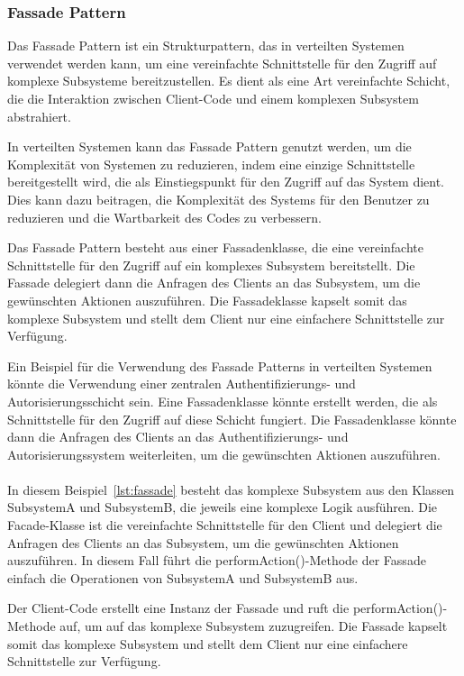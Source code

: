 \subsubsection{Fassade Pattern}
Das Fassade Pattern ist ein Strukturpattern, das in verteilten Systemen verwendet werden kann, um eine vereinfachte Schnittstelle für den Zugriff auf komplexe Subsysteme bereitzustellen. Es dient als eine Art vereinfachte Schicht, die die Interaktion zwischen Client-Code und einem komplexen Subsystem abstrahiert.

In verteilten Systemen kann das Fassade Pattern genutzt werden, um die Komplexität von Systemen zu reduzieren, indem eine einzige Schnittstelle bereitgestellt wird, die als Einstiegspunkt für den Zugriff auf das System dient. Dies kann dazu beitragen, die Komplexität des Systems für den Benutzer zu reduzieren und die Wartbarkeit des Codes zu verbessern.

Das Fassade Pattern besteht aus einer Fassadenklasse, die eine vereinfachte Schnittstelle für den Zugriff auf ein komplexes Subsystem bereitstellt. Die Fassade delegiert dann die Anfragen des Clients an das Subsystem, um die gewünschten Aktionen auszuführen. Die Fassadeklasse kapselt somit das komplexe Subsystem und stellt dem Client nur eine einfachere Schnittstelle zur Verfügung.

Ein Beispiel für die Verwendung des Fassade Patterns in verteilten Systemen könnte die Verwendung einer zentralen Authentifizierungs- und Autorisierungsschicht sein. Eine Fassadenklasse könnte erstellt werden, die als Schnittstelle für den Zugriff auf diese Schicht fungiert. Die Fassadenklasse könnte dann die Anfragen des Clients an das Authentifizierungs- und Autorisierungssystem weiterleiten, um die gewünschten Aktionen auszuführen.
\\\\
In diesem Beispiel~\ref{lst:fassade} besteht das komplexe Subsystem aus den Klassen SubsystemA und SubsystemB, die jeweils eine komplexe Logik ausführen. Die Facade-Klasse ist die vereinfachte Schnittstelle für den Client und delegiert die Anfragen des Clients an das Subsystem, um die gewünschten Aktionen auszuführen. In diesem Fall führt die performAction()-Methode der Fassade einfach die Operationen von SubsystemA und SubsystemB aus.

Der Client-Code erstellt eine Instanz der Fassade und ruft die performAction()-Methode auf, um auf das komplexe Subsystem zuzugreifen. Die Fassade kapselt somit das komplexe Subsystem und stellt dem Client nur eine einfachere Schnittstelle zur Verfügung.

